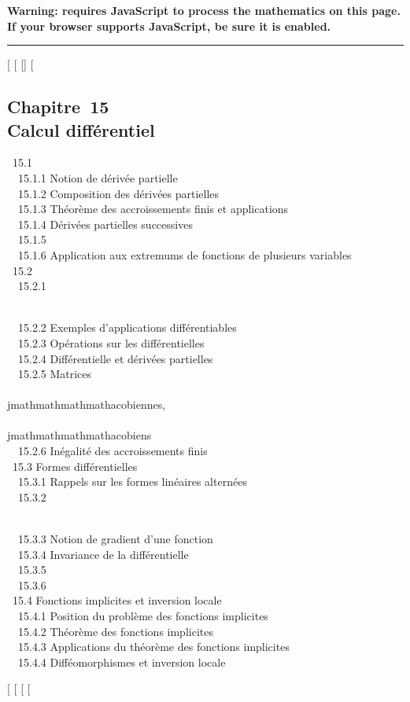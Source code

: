 \textbf{Warning: 
requires JavaScript to process the mathematics on this page.\\ If your
browser supports JavaScript, be sure it is enabled.}

\begin{center}\rule{3in}{0.4pt}\end{center}

{[}
{[}
{[}{]}
{[}

\subsection{Chapitre~15\\Calcul différentiel}

~15.1  \\
~~15.1.1 {Notion de dérivée
partielle} \\ ~~15.1.2
{Composition des dérivées
partielles} \\ ~~15.1.3
{Théorème des accroissements
finis et applications} \\ ~~15.1.4
{Dérivées partielles
successives} \\ ~~15.1.5
 \\ ~~15.1.6
{Application aux extremums de
fonctions de plusieurs variables} \\ ~15.2
 \\ ~~15.2.1

\\ ~~15.2.2 {Exemples
d'applications différentiables} \\ ~~15.2.3
{Opérations sur les
différentielles} \\ ~~15.2.4
{Différentielle et dérivées
partielles} \\ ~~15.2.5
{Matrices \\\\jmathmathmathmathacobiennes,
\\\\jmathmathmathmathacobiens} \\ ~~15.2.6
{Inégalité des accroissements
finis} \\ ~15.3 {Formes
différentielles} \\ ~~15.3.1
{Rappels sur les formes
linéaires alternées} \\ ~~15.3.2

\\ ~~15.3.3 {Notion de gradient
d'une fonction} \\ ~~15.3.4
{Invariance de la
différentielle} \\ ~~15.3.5
 \\
~~15.3.6 
\\ ~15.4 {Fonctions implicites et
inversion locale} \\ ~~15.4.1
{Position du problème des
fonctions implicites} \\ ~~15.4.2
{Théorème des fonctions
implicites} \\ ~~15.4.3
{Applications du théorème des
fonctions implicites} \\ ~~15.4.4
{Difféomorphismes et inversion
locale}

{[}
{[}
{[}
{[}
